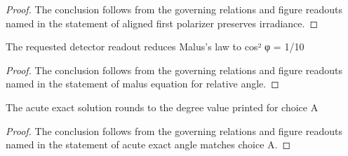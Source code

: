\begin{proof}
  The conclusion follows from the governing relations and figure readouts named in the statement of aligned first polarizer preserves irradiance.
\end{proof}
\begin{lemma}
  \label{lem:physics:phyx-mini-0094:phyxminiproblems-problemphyxmini0094-malus-equation-for-relative-angle}
  The requested detector readout reduces Malus's law to cos² φ = 1/10
\end{lemma}
\begin{proof}
  The conclusion follows from the governing relations and figure readouts named in the statement of malus equation for relative angle.
\end{proof}
\begin{lemma}
  \label{lem:physics:phyx-mini-0094:phyxminiproblems-problemphyxmini0094-acute-exact-angle-matches-choice-a}
  The acute exact solution rounds to the degree value printed for choice A
\end{lemma}
\begin{proof}
  The conclusion follows from the governing relations and figure readouts named in the statement of acute exact angle matches choice A.
\end{proof}
